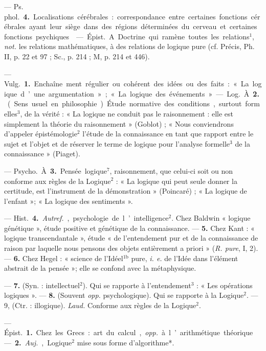 \begin{itemize}[leftmargin=1cm, label=, itemsep=1pt]
— \si{Ps. phol.} {\bf 4.} Localisations cérébrales : correspondance entre certaines fonctions cérébrales ayant leur
siège dans des régions déterminées
du cerveau et certaines fonctions
psychiques.

 — \si{Épist.} A. Doctrine qui
ramène toutes les relations$^1$, {\it not.}
les relations mathématiques, à des
relations de logique pure (cf. Précis,
Ph. II, p. 22 et 97 ; Sc., p. 214 ; M,
p. 214 et 446).

 — \si{Vulg.} {\bf 1.} Enchaîne
ment régulier ou cohérent des idées
ou des faits : « La logique d’une
argumentation »; « La logique des
événements ».

— \si{Log.} À. {\bf 2.} (Sens usuel en philosophie). Étude normative des conditions, surtout formelles$^3$, de la vérité :
« La logique ne conduit pas le
raisonnement : elle est simplement
la théorie du raisonnement » (Goblot) ; « Nous conviendrons d'appeler
épistémologie$^2$ l'étude de la connaissance en tant que rapport entre le
sujet et l’objet et de réserver le
terme de logique pour l'analyse formelle$^3$ de la connaissance » (Piaget).

— \si{Psycho.} À. {\bf 3.} Pensée logique$^7$,
raisonnement, que celui-ci soit ou
non conforme aux règles de la Logique$^2$ : « La logique qui peut seule
donner la certitude, est l’instrument de la démonstration » (Poincaré) ; « La logique de l’enfant »;
« La logique des sentiments ».

— \si{Hist.} {\bf 4.} {\it Autref.}, psychologie
de l’intelligence$^2$. Chez Baldwin
« logique génétique », étude positive et génétique de la connaissance.
— {\bf 5.} Chez Kant : « logique transcendantale », étude « de l’entendement pur et de la connaissance de
raison par laquelle nous pensons
des objets entièrement a priori »
({\it R. pure}, I, 2). — {\bf 6.} Chez Hegel :
« science de l'Idéel$^\text{1b}$ pure, {\it i. e.} de
l’Idée dans l'élément abstrait de la
pensée »; elle se confond avec la
métaphysique.

 — {\bf 7.} (Syn. : intellectuel$^2$). Qui se rapporte à l’entendement$^3$ : « Les opérations logiques ».
— {\bf 8.} (Souvent {\it opp.} psychologique).
Qui se rapporte à la Logique$^2$. — 9,
(Ctr. : illogique). {\it Laud.} Conforme
aux règles de la Logique$^2$.

 — \si{Épist.} {\bf 1.} Chez les Grecs :
art du calcul, {\it opp.} à l’arithmétique
théorique. — {\bf 2.} {\it Auj.}, Logique$^2$ mise
sous forme d’algorithme*.


\end{itemize}

